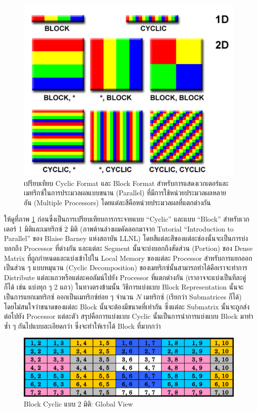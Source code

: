 \begin{figure}[htbp]
  \centering
  \includegraphics[width=0.7\linewidth]{fig/block_cyclic.png}
  \caption{เปรียบเทียบ Cyclic Format และ Block Format สำหรับการแสดงเวกเตอร์และเมทริกซ์ในการประมวลผลแบบขนาน (Parallel)
    ที่มีการใช้หน่วยประมวลผลหลายอัน (Multiple Processors) โดยแต่ละสีคือหน่วยประมวลผลที่แตกต่างกัน}
  \label{fig:block_cyclic}
\end{figure}

ให้ดูที่ภาพ \ref{fig:block_cyclic} ก่อนซึ่งเป็นการเปรียบเทียบการกระจายแบบ \enquote{Cyclic} และแบบ \enquote{Block}
สำหรับเวกเตอร์ 1 มิติและเมทริกซ์ 2 มิติ (ภาพด้านล่างผมคัดลอกมาจาก Tutorial \enquote{Introduction to Parallel} ของ Blaise
Barney แห่งสถาบัน LLNL) โดยสีแต่ละสีของแต่ละช่องนั้นจะเป็นการบ่งบอกถึง Processor ที่ต่างกัน และแต่ละ Segment นั้นจะบ่งบอกถึงสัดส่วน
(Portion) ของ Dense Matrix ที่ถูกกำหนดและแบ่งเข้าไปใน Local Memory ของแต่ละ Processor สำหรับการแยกออกเป็นส่วน ๆ แบบหมุนวน
(Cyclic Decomposition) ของเมทริกซ์นั้นสามารถทำได้คือเราจะทำการ Distribute แต่ละแถวหรือแต่ละคอลัมน์ไปยัง Processor ที่แตกต่างกัน
(เราอาจจะแบ่งเป็นทีละคู่ก็ได้ เช่น แบ่งทุก ๆ 2 แถว) ในทางตรงข้ามนั้น วิธีการแบ่งแบบ Block Representation นั้นจะเป็นการแยกเมทริกซ์%
ออกเป็นเมทริกซ์ย่อย ๆ จำนวน $N$ เมทริกซ์ (เรียกว่า Submatrices ก็ได้) โดยไม่สนใจว่าขนาดของแต่ละ Block นั้นจะต้องมีขนาดที่เท่ากัน
ซึ่งแต่ละ Submatrix นั้นจะถูกส่งต่อไปยัง Processor แต่ละตัว สรุปคือการแบ่งแบบ Cyclic นั้นเป็นการนำการแบ่งแบบ Block มาทำซ้ำ ๆ
กันไปแบบละเอียดกว่า ซึ่งจะทำให้เราได้ Block ที่มากกว่า

\begin{figure}[htbp]
  \centering
  \includegraphics[width=0.7\linewidth]{fig/block_cyclic_matrix_global.png}
  \caption{Block Cyclic แบบ 2 มิติ: Global View}
  \label{fig:block_cyclic_matrix_global}
\end{figure}


